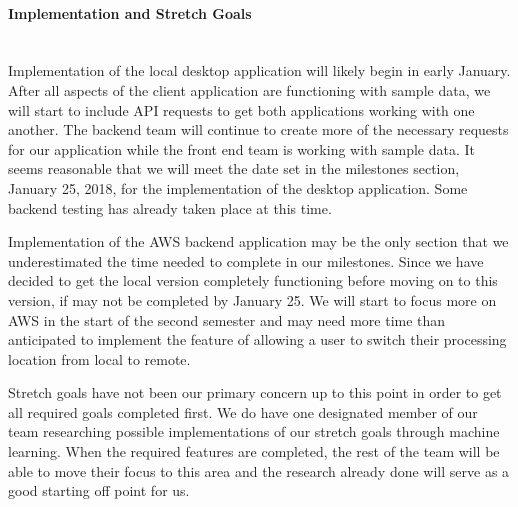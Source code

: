 \paragraph{Implementation and Stretch Goals} \mbox{}\\[\paragraphheaderspace]
Implementation of the local desktop application will likely begin in early January. After all aspects of the client application are functioning with sample data, we will start to include API requests to get both applications working with one another. The backend team will continue to create more of the necessary requests for our application while the front end team is working with sample data. It seems reasonable that we will meet the date set in the milestones section, January 25, 2018, for the implementation of the desktop application. Some backend testing has already taken place at this time.\par
Implementation of the AWS backend application may be the only section that we underestimated the time needed to complete in our milestones. Since we have decided to get the local version completely functioning before moving on to this version, if may not be completed by January 25. We will start to focus more on AWS in the start of the second semester and may need more time than anticipated to implement the feature of allowing a user to switch their processing location from local to remote.\par
Stretch goals have not been our primary concern up to this point in order to get all required goals completed first. We do have one designated member of our team researching possible implementations of our stretch goals through machine learning. When the required features are completed, the rest of the team will be able to move their focus to this area and the research already done will serve as a good starting off point for us.\par 